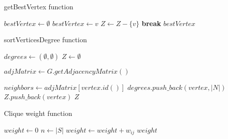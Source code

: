 \begin{algorithm}[H]
    \caption{getBestVertex function}
    \label{getbestvertex-pseudocode}
    \begin{algorithmic}[1]
        \State $bestVertex \gets \emptyset$
        \State $bestVertex \gets v$
        \State $Z \gets Z - \{v\}$
        \State \textbf{break}
        \EndIf
        \EndFor
        \State \Return $bestVertex$
        \EndProcedure
    \end{algorithmic}
\end{algorithm}

\begin{algorithm}[H]
    \caption{sortVerticesDegree function}
    \label{sortverticesdegree-pseudocode}
    \begin{algorithmic}[1]
        \State $degrees \gets (\emptyset, \emptyset)$ 
        \State $Z \gets \emptyset$

        \State $adjMatrix \gets G.getAdjacencyMatrix()$

        \State $neighbors \gets adjMatrix[vertex.id()]$
        \State $degrees.push\_back(vertex, |N|)$
        \EndFor
        \State {} 
        \State $Z.push\_back(vertex)$
        \EndFor
        \State \Return $Z$
        \EndProcedure
    \end{algorithmic}
\end{algorithm}

\begin{algorithm}[H]
    \caption{Clique weight function}
    \label{clique-weight2-pseudocode}
    \begin{algorithmic}[1]
         
        \State $weight \gets 0$
        \State $n \gets |S|$
         
         
        \State $weight \gets weight + w_{ij}$ 
        \EndFor
        \EndFor
        \State \Return $weight$
        \EndProcedure
    \end{algorithmic}
\end{algorithm}